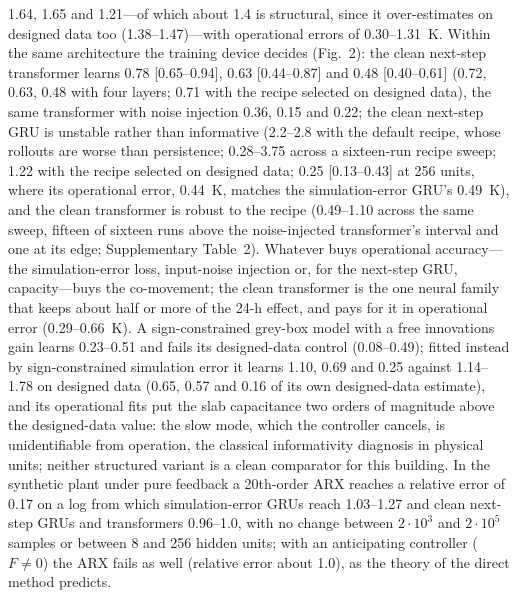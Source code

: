 \documentclass[11pt]{article}
\begin{document}
1.64, 1.65 and 1.21---of which about 1.4 is structural, since it over-estimates on designed data too (1.38--1.47)---with operational errors of 0.30--1.31~K. Within the same architecture the training device decides (Fig.~2): the clean next-step transformer learns $0.78$ [0.65--0.94], $0.63$ [0.44--0.87] and $0.48$ [0.40--0.61] (0.72, 0.63, 0.48 with four layers; 0.71 with the recipe selected on designed data), the same transformer with noise injection 0.36, 0.15 and 0.22; the clean next-step GRU is unstable rather than informative (2.2--2.8 with the default recipe, whose rollouts are worse than persistence; 0.28--3.75 across a sixteen-run recipe sweep; 1.22 with the recipe selected on designed data; 0.25 [0.13--0.43] at 256 units, where its operational error, 0.44~K, matches the simulation-error GRU's 0.49~K), and the clean transformer is robust to the recipe (0.49--1.10 across the same sweep, fifteen of sixteen runs above the noise-injected transformer's interval and one at its edge; Supplementary Table~2). Whatever buys operational accuracy---the simulation-error loss, input-noise injection or, for the next-step GRU, capacity---buys the co-movement; the clean transformer is the one neural family that keeps about half or more of the 24-h effect, and pays for it in operational error (0.29--0.66~K). A sign-constrained grey-box model with a free innovations gain learns 0.23--0.51 and fails its designed-data control (0.08--0.49); fitted instead by sign-constrained simulation error it learns 1.10, 0.69 and 0.25 against 1.14--1.78 on designed data (0.65, 0.57 and 0.16 of its own designed-data estimate), and its operational fits put the slab capacitance two orders of magnitude above the designed-data value: the slow mode, which the controller cancels, is unidentifiable from operation, the classical informativity diagnosis in physical units; neither structured variant is a clean comparator for this building. In the synthetic plant under pure feedback a 20th-order ARX reaches a relative error of 0.17 on a log from which simulation-error GRUs reach 1.03--1.27 and clean next-step GRUs and transformers 0.96--1.0, with no change between $2{\cdot}10^3$ and $2{\cdot}10^5$ samples or between 8 and 256 hidden units; with an anticipating controller ($F\neq0$) the ARX fails as well (relative error about 1.0), as the theory of the direct method predicts.
\end{document}

